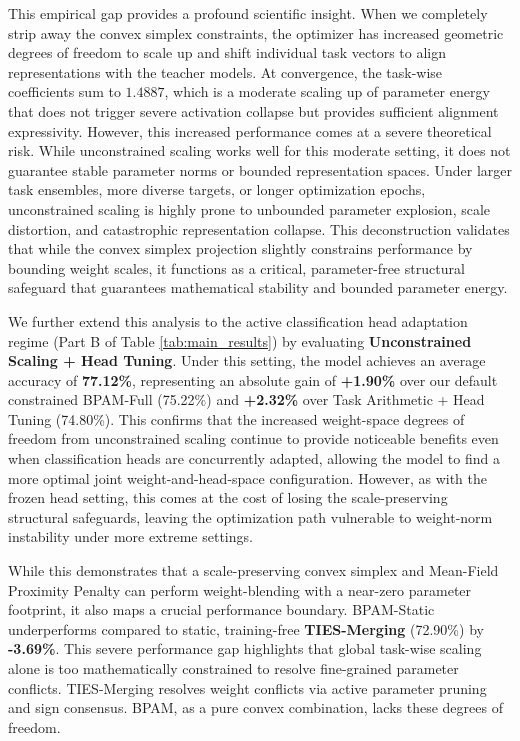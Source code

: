 This empirical gap provides a profound scientific insight. When we completely strip away the convex simplex constraints, the optimizer has increased geometric degrees of freedom to scale up and shift individual task vectors to align representations with the teacher models. At convergence, the task-wise coefficients sum to $1.4887$, which is a moderate scaling up of parameter energy that does not trigger severe activation collapse but provides sufficient alignment expressivity. However, this increased performance comes at a severe theoretical risk. While unconstrained scaling works well for this moderate setting, it does not guarantee stable parameter norms or bounded representation spaces. Under larger task ensembles, more diverse targets, or longer optimization epochs, unconstrained scaling is highly prone to unbounded parameter explosion, scale distortion, and catastrophic representation collapse. This deconstruction validates that while the convex simplex projection slightly constrains performance by bounding weight scales, it functions as a critical, parameter-free structural safeguard that guarantees mathematical stability and bounded parameter energy.

We further extend this analysis to the active classification head adaptation regime (Part B of Table \ref{tab:main_results}) by evaluating {\bf Unconstrained Scaling + Head Tuning}. Under this setting, the model achieves an average accuracy of {\bf 77.12\%}, representing an absolute gain of {\bf +1.90\%} over our default constrained BPAM-Full (75.22\%) and {\bf +2.32\%} over Task Arithmetic + Head Tuning (74.80\%). This confirms that the increased weight-space degrees of freedom from unconstrained scaling continue to provide noticeable benefits even when classification heads are concurrently adapted, allowing the model to find a more optimal joint weight-and-head-space configuration. However, as with the frozen head setting, this comes at the cost of losing the scale-preserving structural safeguards, leaving the optimization path vulnerable to weight-norm instability under more extreme settings.

While this demonstrates that a scale-preserving convex simplex and Mean-Field Proximity Penalty can perform weight-blending with a near-zero parameter footprint, it also maps a crucial performance boundary. BPAM-Static underperforms compared to static, training-free {\bf TIES-Merging} (72.90\%) by {\bf -3.69\%}. This severe performance gap highlights that global task-wise scaling alone is too mathematically constrained to resolve fine-grained parameter conflicts. TIES-Merging resolves weight conflicts via active parameter pruning and sign consensus. BPAM, as a pure convex combination, lacks these degrees of freedom.

